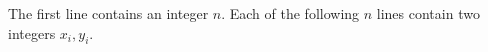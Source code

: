 The first line contains an integer $n$.
Each of the following $n$ lines contain two integers $x_i,y_i$.
